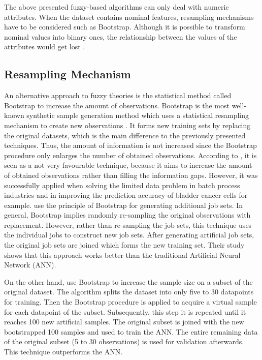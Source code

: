 \documentclass[parskip=full]{scrartcl}
\begin{document}
The above presented fuzzy-based algorithms can only deal with numeric attributes. When the dataset contains nominal features, resampling mechanisms have to be considered such as Bootstrap. Although it is possible to transform nominal values into binary ones, the relationship between the values of the attributes would get lost \cite{Tsai.2008}. 

\subsection{Resampling Mechanism}

An alternative approach to fuzzy theories is the statistical method called Bootstrap to increase the amount of observations. Bootstrap is the most well-known synthetic sample generation method which uses a statistical resampling mechanism to create new observations \cite{AbdulLateh.2017}. It forms new training sets by replacing the original datasets, which is the main difference to the previously presented techniques. Thus, the amount of information is not increased since the Bootstrap procedure only enlarges the number of obtained observations. According to \cite{Tsai.2015}, it is seen as a not very favourable technique, because it aims to increase the amount of obtained observations rather than filling the information gaps. However, it was successfully applied when solving the limited data problem in batch process industries \cite{Ivanescu.2006} and in improving the prediction accuracy of bladder cancer cells \cite{Chao.2011} for example. \cite{Ivanescu.2006} use the principle of Bootstrap for generating additional job sets. In general, Bootstrap implies randomly re-sampling the original observations with replacement. However, rather than re-sampling the job sets, this technique uses the individual jobs to construct new job sets. After generating artificial job sets, the original job sets are joined which forms the new training set. Their study shows that this approach works better than the traditional Artificial Neural Network (ANN).

On the other hand, \cite{Chao.2011} use Bootstrap to increase the sample size on a subset of the original dataset. The algorithm splits the dataset into only five to 30 datapoints for training. Then the Bootstrap procedure is applied to acquire a virtual sample for each datapoint of the subset. Subsequently, this step it is repeated until it reaches 100 new artificial samples. The original subset is joined with the new bootstrapped 100 samples and used to train the ANN. The entire remaining data of the original subset (5 to 30 observations) is used for validation afterwards. This technique outperforms the ANN.
\end{document}
